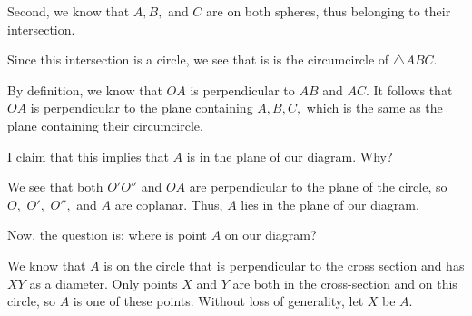 Second, we know that $A, B,$ and $C$ are on both spheres, thus belonging to their intersection.

Since this intersection is a circle, we see that is is the circumcircle of $\triangle ABC.$

By definition, we know that $OA$ is perpendicular to $AB$ and $AC.$ It follows that $OA$ is perpendicular to the plane containing $A,B,C,$ which is the same as the plane containing their circumcircle.

I claim that this implies that $A$ is in the plane of our diagram. Why?



We see that both $O'O''$ and $OA$ are perpendicular to the plane of the circle, so $O,$ $O',$ $O'',$ and $A$ are coplanar. Thus, $A$ lies in the plane of our diagram.

Now, the question is: where is point $A$ on our diagram?



We know that $A$ is on the circle that is perpendicular to the cross section and has $XY$ as a diameter. Only points $X$ and $Y$ are both in the cross-section and on this circle, so $A$ is one of these points. Without loss of generality, let $X$ be $A.$




